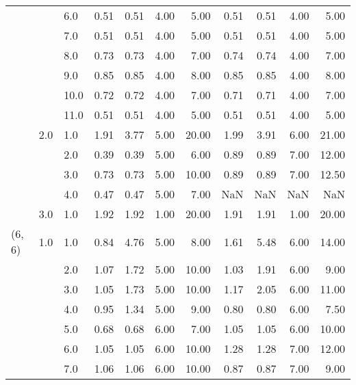\begin{tabular}{lllrrrrrrrr}
       &     & 6.0  &       0.51 &      0.51 & 4.00 &   5.00 &       0.51 &      0.51 & 4.00 &   5.00 \\
       &     & 7.0  &       0.51 &      0.51 & 4.00 &   5.00 &       0.51 &      0.51 & 4.00 &   5.00 \\
       &     & 8.0  &       0.73 &      0.73 & 4.00 &   7.00 &       0.74 &      0.74 & 4.00 &   7.00 \\
       &     & 9.0  &       0.85 &      0.85 & 4.00 &   8.00 &       0.85 &      0.85 & 4.00 &   8.00 \\
       &     & 10.0 &       0.72 &      0.72 & 4.00 &   7.00 &       0.71 &      0.71 & 4.00 &   7.00 \\
       &     & 11.0 &       0.51 &      0.51 & 4.00 &   5.00 &       0.51 &      0.51 & 4.00 &   5.00 \\
       & 2.0 & 1.0  &       1.91 &      3.77 & 5.00 &  20.00 &       1.99 &      3.91 & 6.00 &  21.00 \\
       &     & 2.0  &       0.39 &      0.39 & 5.00 &   6.00 &       0.89 &      0.89 & 7.00 &  12.00 \\
       &     & 3.0  &       0.73 &      0.73 & 5.00 &  10.00 &       0.89 &      0.89 & 7.00 &  12.50 \\
       &     & 4.0  &       0.47 &      0.47 & 5.00 &   7.00 &        NaN &       NaN &  NaN &    NaN \\
       & 3.0 & 1.0  &       1.92 &      1.92 & 1.00 &  20.00 &       1.91 &      1.91 & 1.00 &  20.00 \\
(6, 6) & 1.0 & 1.0  &       0.84 &      4.76 & 5.00 &   8.00 &       1.61 &      5.48 & 6.00 &  14.00 \\
       &     & 2.0  &       1.07 &      1.72 & 5.00 &  10.00 &       1.03 &      1.91 & 6.00 &   9.00 \\
       &     & 3.0  &       1.05 &      1.73 & 5.00 &  10.00 &       1.17 &      2.05 & 6.00 &  11.00 \\
       &     & 4.0  &       0.95 &      1.34 & 5.00 &   9.00 &       0.80 &      0.80 & 6.00 &   7.50 \\
       &     & 5.0  &       0.68 &      0.68 & 6.00 &   7.00 &       1.05 &      1.05 & 6.00 &  10.00 \\
       &     & 6.0  &       1.05 &      1.05 & 6.00 &  10.00 &       1.28 &      1.28 & 7.00 &  12.00 \\
       &     & 7.0  &       1.06 &      1.06 & 6.00 &  10.00 &       0.87 &      0.87 & 7.00 &   9.00 \\

\end{tabular}
